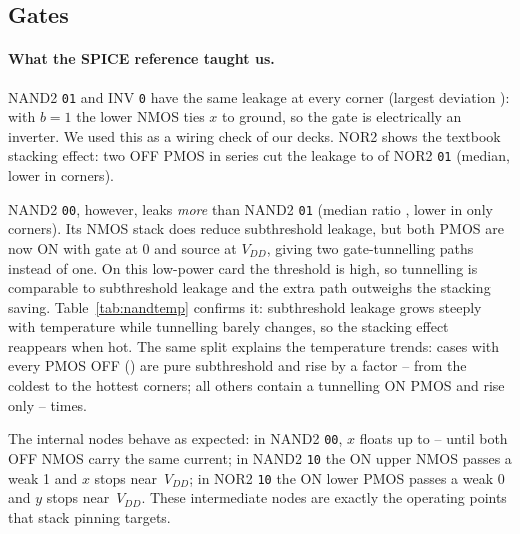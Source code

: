 \subsection{Gates}\label{sec:errgates}
\paragraph{What the SPICE reference taught us.}
NAND2 \texttt{01} and INV \texttt{0} have the same leakage at every corner (largest deviation
\NandZeroOneInvDev): with $b=1$ the lower NMOS ties $x$ to ground, so the gate is electrically an
inverter. We used this as a wiring check of our decks. NOR2 shows the textbook stacking effect:
two OFF PMOS in series cut the leakage to \NorStackARatio{} of NOR2 \texttt{01} (median, lower in
\NorStackALower{} corners).

NAND2 \texttt{00}, however, leaks \emph{more} than NAND2 \texttt{01} (median ratio
\NandZeroARatio, lower in only \NandZeroALower{} corners). Its NMOS stack does reduce subthreshold
leakage, but both PMOS are now ON with gate at 0 and source at $V_{DD}$, giving two gate-tunnelling
paths instead of one. On this low-power card the threshold is high, so tunnelling is comparable to
subthreshold leakage and the extra path outweighs the stacking saving. Table~\ref{tab:nandtemp}
confirms it: subthreshold leakage grows steeply with temperature while tunnelling barely changes,
so the stacking effect reappears when hot. The same split explains the temperature trends: cases
with every PMOS OFF (\StrongCases) are pure subthreshold and rise by a factor
\StrongHotColdMin--\StrongHotColdMax{} from the coldest to the hottest corners; all others contain
a tunnelling ON PMOS and rise only \WeakHotColdMin--\WeakHotColdMax{} times.

\begin{table}[H]
  \centering
  \small
  \caption{NAND2 \texttt{00} vs.\ \texttt{01} (SPICE) by temperature: stacking only wins once
  subthreshold leakage dominates.}
  \label{tab:nandtemp}
  \fittable{}
\end{table}

The internal nodes behave as expected: in NAND2 \texttt{00}, $x$ floats up to
\VxZeroZeroMin--\VxZeroZeroMax{} until both OFF NMOS carry the same current; in NAND2 \texttt{10}
the ON upper NMOS passes a weak 1 and $x$ stops near \VxOneZeroFrac\,$V_{DD}$; in NOR2 \texttt{10}
the ON lower PMOS passes a weak 0 and $y$ stops near \VyOneZeroFrac\,$V_{DD}$. These intermediate
nodes are exactly the operating points that stack pinning targets.

